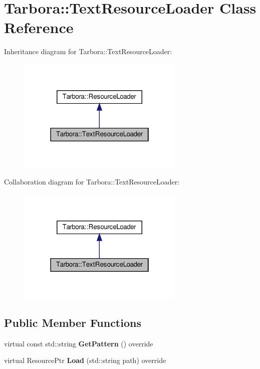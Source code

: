 \hypertarget{classTarbora_1_1TextResourceLoader}{}\section{Tarbora\+:\+:Text\+Resource\+Loader Class Reference}
\label{classTarbora_1_1TextResourceLoader}


Inheritance diagram for Tarbora\+:\+:Text\+Resource\+Loader\+:\nopagebreak
\begin{figure}[H]
\begin{center}
\leavevmode
\includegraphics[width=226pt]{classTarbora_1_1TextResourceLoader__inherit__graph}
\end{center}
\end{figure}


Collaboration diagram for Tarbora\+:\+:Text\+Resource\+Loader\+:\nopagebreak
\begin{figure}[H]
\begin{center}
\leavevmode
\includegraphics[width=226pt]{classTarbora_1_1TextResourceLoader__coll__graph}
\end{center}
\end{figure}
\subsection*{Public Member Functions}
\begin{DoxyCompactItemize}
\item 
\mbox{\label{classTarbora_1_1TextResourceLoader_aa6ac4b5eeb4fec34cbd0f371dd6f74a6}} 
virtual const std\+::string {\bfseries Get\+Pattern} () override
\item 
\mbox{\label{classTarbora_1_1TextResourceLoader_a67830049a05872cda3e0b250c83efcdd}} 
virtual Resource\+Ptr {\bfseries Load} (std\+::string path) override
\end{DoxyCompactItemize}


